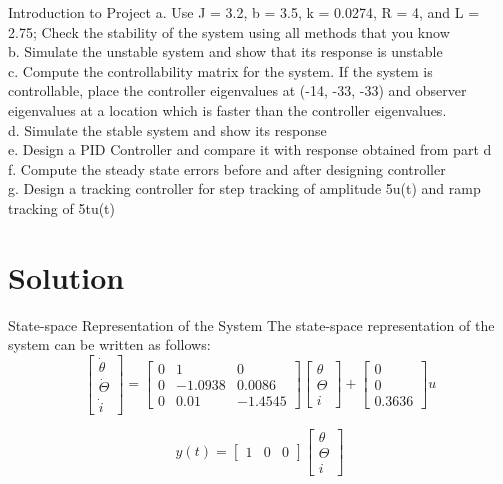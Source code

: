 \documentclass[10pt,compress,mathserif]{beamer}
\begin{document}
\begin{frame}{Introduction to Project}
a. Use J = 3.2, b = 3.5, k = 0.0274, R = 4, and L = 2.75; Check the stability of the system using all methods that you know \\ \vskip10pt
b. Simulate the unstable system and show that its response is unstable \\ \vskip10pt
c. Compute the controllability matrix for the system. If the system is controllable, place the controller eigenvalues at (-14, -33, -33) and observer eigenvalues at a location which is faster than the controller eigenvalues.\\ \vskip10pt
d. Simulate the stable system and show its response \\ 
\vskip10pt
e. Design a PID Controller and compare it with response obtained from part d\\ \vskip10pt
f. Compute the steady state errors before and after designing controller\\ \vskip10pt
g. Design a tracking controller for step tracking of amplitude 5u(t) and ramp tracking of 5tu(t)\\ 
\end{frame}



\section{Solution}
\begin{frame}{State-space Representation of the System}
The state-space representation of the system can be written as follows:
\begin{equation}
\begin{bmatrix} \dot{\theta}\\  \dot{\Theta} \\ \dot{i}\end{bmatrix}
= \begin{bmatrix}
0 & 1 & 0 \\
0 & -1.0938 & 0.0086 \\
0 & 0.01 & -1.4545  \end{bmatrix}
\begin{bmatrix} \theta\\  \Theta \\ i \end{bmatrix} +
\begin{bmatrix}
0 \\
0 \\
0.3636  \end{bmatrix}
 u 
\end{equation}\vskip10pt


\begin{equation}
y(t)=\begin{bmatrix}
1 & 0 & 0
\end{bmatrix}
\begin{bmatrix} \theta \\  \Theta \\ i \end{bmatrix}
\end{equation}

\end{frame}
\end{document}

